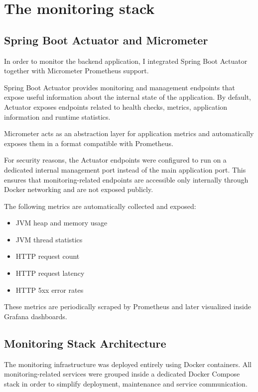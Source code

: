 \documentclass[11pt,a4paper]{article}
\begin{document}
\section{The monitoring stack}

\subsection{Spring Boot Actuator and Micrometer}

In order to monitor the backend application, I integrated Spring Boot Actuator together with Micrometer Prometheus support.

Spring Boot Actuator provides monitoring and management endpoints that expose useful information about the internal state of the application. 
By default, Actuator exposes endpoints related to health checks, metrics, application information and runtime statistics.

Micrometer acts as an abstraction layer for application metrics and automatically exposes them in a format compatible with Prometheus.

For security reasons, the Actuator endpoints were configured to run on a dedicated internal management port instead of the main application port. 
This ensures that monitoring-related endpoints are accessible only internally through Docker networking and are not exposed publicly.

The following metrics are automatically collected and exposed:

\begin{itemize}
    \item JVM heap and memory usage
    \item JVM thread statistics
    \item HTTP request count
    \item HTTP request latency
    \item HTTP 5xx error rates
\end{itemize}

These metrics are periodically scraped by Prometheus and later visualized inside Grafana dashboards.

\subsection{Monitoring Stack Architecture}

The monitoring infrastructure was deployed entirely using Docker containers. All monitoring-related services were grouped inside a dedicated 
Docker Compose stack in order to simplify deployment, maintenance and service communication.
\end{document}
